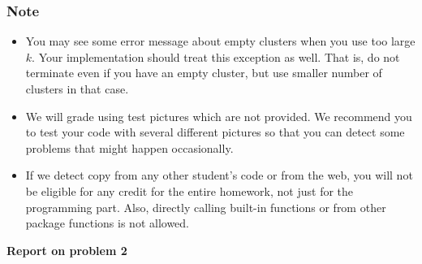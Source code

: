 \documentclass[twoside,10pt]{article}
\begin{document}
\subsubsection*{Note}
\begin{itemize}
  \item You may see some error message about empty clusters when you use too large $k$. Your implementation should treat this exception as well. That is, do not terminate even if you have an empty cluster, but use smaller number of clusters in that case.

  \item We will grade using test pictures which are not provided. We recommend you to test your code with several different pictures so that you can detect some problems that might happen occasionally. 

  \item If we detect copy from any other student's code or from the web, you will not be eligible for any credit for the entire homework, not just for the programming part. Also, directly calling built-in functions or from other package functions is not allowed.
\end{itemize}
\begin{tcolorbox}
\begin{center}
    \textbf{Report on problem 2}
\end{center}
\end{tcolorbox}
\end{document}

